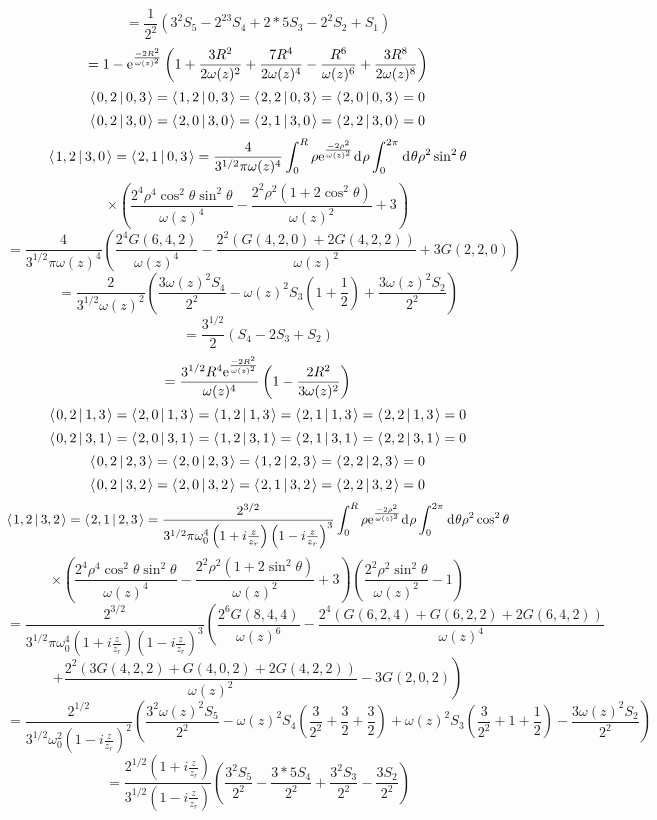 \documentclass[11pt]{amsart}
\makeatletter
\newcommand{\e}{{\rm e}}				%
\newcommand{\msp}[1]{\mspace{#1mu}}		%
\newcommand{\0}{\varnothing}		%
\newcommand{\dd}{\msp{1} {\rm{d}} \msp{1}}	%
\newcommand{\brac}[2]{\left\langle\msp{2} #1\left\lvert \msp{3.5} #2 \right.\right\rangle}	%
\newcommand{\1}{!}
\newcommand{\2}{@}
\newcommand{\3}{\#}
\newcommand{\4}{\$}
\newcommand{\5}{\%}
\newcommand{\6}{$^\wedge$}
\newcommand{\7}{\&}
\newcommand{\8}{*}
\newcommand{\9}{(}
\makeatother
\begin{document}
\[
=\frac{1}{2^2}\left(3^2S_5-2^23S_4+2*5S_3-2^2S_2+S_1\right)
\]
\[
=1-\e^{\frac{-2R^2}{\omega(z)^2}}\left(1+\frac{3R^2}{2\omega(z)^2}+\frac{7R^4}{2\omega(z)^4}-\frac{R^6}{\omega(z)^6}+\frac{3R^8}{2\omega(z)^8}\right)
\]
\[
\brac{0,2}{0,3} = \brac{1,2}{0,3} = \brac{2,2}{0,3} = \brac{2,0}{0,3} =0
\]
\[
\brac{0,2}{3,0} = \brac{2,0}{3,0} = \brac{2,1}{3,0} = \brac{2,2}{3,0} = 0
\]
\[
\brac{1,2}{3,0} = \brac{2,1}{0,3} = \frac{4}{3^{1/2}\pi\omega(z)^4}\int_0^R\rho \e^{\frac{-2\rho^2}{\omega(z)^2}}\dd \rho \int_0^{2\pi}\dd \theta \rho^2\sin^2\theta
\]
\[
\times\left(\frac{2^4\rho^4\cos^2\theta\sin^2\theta}{\omega(z)^4}-\frac{2^2\rho^2\left(1+2\cos^2\theta\right)}{\omega(z)^2}+3\right)
\]
\[
=\frac{4}{3^{1/2}\pi \omega(z)^4}\left(\frac{2^4G(6,4,2)}{\omega(z)^4}-\frac{2^2\left(G(4,2,0)+2G(4,2,2)\right)}{\omega(z)^2}+3G(2,2,0)\right)
\]
\[
=\frac{2}{3^{1/2}\omega(z)^2}\left(\frac{3\omega(z)^2S_4}{2^2}-\omega(z)^2S_3\left(1+\frac{1}{2}\right)+\frac{3\omega(z)^2S_2}{2^2}\right)
\]
\[
=\frac{3^{1/2}}{2}\left(S_4-2S_3+S_2\right)
\]
\[
=\frac{3^{1/2}R^4\e^{\frac{-2R^2}{\omega(z)^2}}}{\omega(z)^4}\left(1-\frac{2R^2}{3\omega(z)^2}\right)
\]
\[
\brac{0,2}{1,3} = \brac{2,0}{1,3} = \brac{1,2}{1,3} = \brac{2,1}{1,3}=\brac{2,2}{1,3}=0
\]
\[
\brac{0,2}{3,1} =   \brac{2,0}{3,1} = \brac{1,2}{3,1} = \brac{2,1}{3,1}=\brac{2,2}{3,1}=0
\]
\[
\brac{0,2}{2,3} = \brac{2,0}{2,3} = \brac{1,2}{2,3} = \brac{2,2}{2,3} = 0
\]
\[
\brac{0,2}{3,2} = \brac{2,0}{3,2} = \brac{2,1}{3,2} = \brac{2,2}{3,2} = 0
\]
\[
\brac{1,2}{3,2} = \brac{2,1}{2,3} = \frac{2^{3/2}}{3^{1/2}\pi\omega_0^4\left(1+i\frac{z}{z_r}\right)\left(1-i\frac{z}{z_r}\right)^3}\int_0^R\rho \e^{\frac{-2\rho^2}{\omega(z)^2}}\dd \rho \int_0^{2\pi}\dd \theta \rho^2\cos^2\theta
\]
\[
\times\left(\frac{2^4\rho^4\cos^2\theta\sin^2\theta}{\omega(z)^4}-\frac{2^2\rho^2\left(1+2\sin^2\theta\right)}{\omega(z)^2}+3\right)\left(\frac{2^2\rho^2\sin^2\theta}{\omega(z)^2}-1\right)
\]
\[
=\frac{2^{3/2}}{3^{1/2}\pi \omega_0^4\left(1+i\frac{z}{z_r}\right)\left(1-i\frac{z}{z_r}\right)^3}\left(\frac{2^6G(8,4,4)}{\omega(z)^6}-\frac{2^4\left(G(6,2,4)+G(6,2,2)+2G(6,4,2)\right)}{\omega(z)^4}\right.
\]
\[
\left.+\frac{2^2\left(3G(4,2,2)+G(4,0,2)+2G(4,2,2)\right)}{\omega(z)^2}-3G(2,0,2)\right)
\]
\[
=\frac{2^{1/2}}{3^{1/2}\omega_0^2\left(1-i\frac{z}{z_r}\right)^2}\left(\frac{3^2\omega(z)^2S_5}{2^2}-\omega(z)^2S_4\left(\frac{3}{2^2}+\frac{3}{2}+\frac{3}{2}\right)+\omega(z)^2S_3\left(\frac{3}{2^2}+1+\frac{1}{2}\right)-\frac{3\omega(z)^2S_2}{2^2}\right)
\]
\[
=\frac{2^{1/2}\left(1+i\frac{z}{z_r}\right)}{3^{1/2}\left(1-i\frac{z}{z_r}\right)}\left(\frac{3^2S_5}{2^2}-\frac{3*5S_4}{2^2}+\frac{3^2S_3}{2^2}-\frac{3S_2}{2^2}\right)
\]
\end{document}
